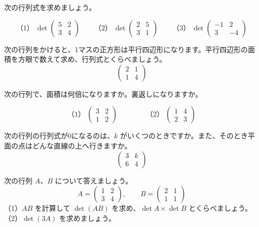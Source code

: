 \bkendproblems
{}

\bkproblem 次の行列式を求めましょう。\par
\[ \text{（1）}\ \det\begin{pmatrix}5&2\\3&4\end{pmatrix}\qquad \text{（2）}\ \det\begin{pmatrix}2&5\\3&1\end{pmatrix}\qquad \text{（3）}\ \det\begin{pmatrix}-1&2\\3&-4\end{pmatrix} \]

\bkproblem 次の行列をかけると、1マスの正方形は平行四辺形になります。平行四辺形の面積を方眼で数えて求め、行列式とくらべましょう。
\[ \begin{pmatrix}2&1\\1&4\end{pmatrix} \]

\bkproblem 次の行列で、面積は何倍になりますか。裏返しになりますか。\par
\[ \text{（1）}\ \begin{pmatrix}3&2\\1&2\end{pmatrix}\qquad\qquad \text{（2）}\ \begin{pmatrix}1&4\\2&3\end{pmatrix} \]

\bkproblem 次の行列の行列式が0になるのは、$k$ がいくつのときですか。また、そのとき平面の点はどんな直線の上へ行きますか。
\[ \begin{pmatrix}3&k\\6&4\end{pmatrix} \]

\bkproblem 次の行列 $A$、$B$ について答えましょう。
\[ A=\begin{pmatrix}1&2\\3&4\end{pmatrix},\qquad B=\begin{pmatrix}2&1\\1&1\end{pmatrix} \]
（1）$AB$ を計算して $\det(AB)$ を求め、$\det A\times\det B$ とくらべましょう。（2）$\det(3A)$ を求めましょう。

